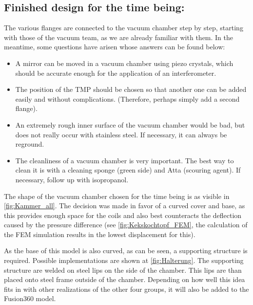 


\subsection{Finished design for the time being:}
The various flanges are connected to the vacuum chamber step by step, starting with those of the vacuum team, as we are already familiar with them.
In the meantime, some questions have arisen whose answers can be found below:

\begin{itemize}
    \item A mirror can be moved in a vacuum chamber using piezo crystals, which should be accurate enough for the application of an interferometer.
    \item The position of the TMP should be chosen so that another one can be added easily and without complications. (Therefore, perhaps simply add a second flange).
    \item An extremely rough inner surface of the vacuum chamber would be bad, but does not really occur with stainless steel. If necessary, it can always be reground.
    \item The cleanliness of a vacuum chamber is very important. The best way to clean it is with a cleaning sponge (green side) and Atta (scouring agent). If necessary, follow up with isopropanol.
\end{itemize}

The shape of the vacuum chamber chosen for the time being is as visible in \autoref{fig:Kammer_all}.
The decision was made in favor of a curved cover and base, as this provides enough space for the coils and also best counteracts the deflection caused by the pressure difference (see \autoref{fig:Kekskochtopf_FEM}, the calculation of the FEM simulation results in the lowest displacement for this).

As the base of this model is also curved, as can be seen, a supporting structure is required.
Possible implementations are shown at \autoref{fig:Halterung}.
The supporting structure are welded on steel lips on the side of the chamber.
This lips are than placed onto steel frame outside of the chamber.
Depending on how well this idea fits in with other realizations of the other four groups, it will also be added to the Fusion360 model.


